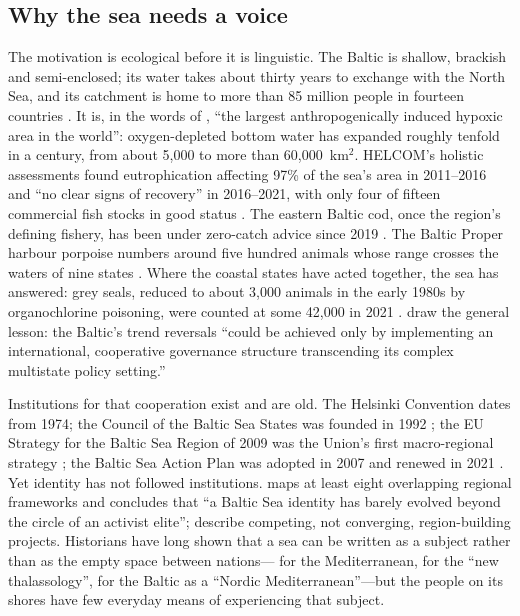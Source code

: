 \subsection{Why the sea needs a voice}
The motivation is ecological before it is linguistic. The Baltic is shallow, brackish and semi-enclosed; its water takes about thirty years to exchange with the North Sea, and its catchment is home to more than 85 million people in fourteen countries \citep{helcom2023}. It is, in the words of \citet{carstensen2014}, ``the largest anthropogenically induced hypoxic area in the world'': oxygen-depleted bottom water has expanded roughly tenfold in a century, from about 5,000 to more than 60,000~km$^2$. HELCOM's holistic assessments found eutrophication affecting 97\% of the sea's area in 2011--2016 and ``no clear signs of recovery'' in 2016--2021, with only four of fifteen commercial fish stocks in good status \citep{helcom2018,helcom2023}. The eastern Baltic cod, once the region's defining fishery, has been under zero-catch advice since 2019 \citep{ices2019}. The Baltic Proper harbour porpoise numbers around five hundred animals whose range crosses the waters of nine states \citep{amundin2022}. Where the coastal states have acted together, the sea has answered: grey seals, reduced to about 3,000 animals in the early 1980s by organochlorine poisoning, were counted at some 42,000 in 2021 \citep{helcomseal}. \citet{reusch2018} draw the general lesson: the Baltic's trend reversals ``could be achieved only by implementing an international, cooperative governance structure transcending its complex multistate policy setting.''

Institutions for that cooperation exist and are old. The Helsinki Convention dates from 1974; the Council of the Baltic Sea States was founded in 1992 \citep{cbss1992}; the EU Strategy for the Baltic Sea Region of 2009 was the Union's first macro-regional strategy \citep{eusbsr2009}; the Baltic Sea Action Plan was adopted in 2007 and renewed in 2021 \citep{helcombsap2021}. Yet identity has not followed institutions. \citet{gotz2016} maps at least eight overlapping regional frameworks and concludes that ``a Baltic Sea identity has barely evolved beyond the circle of an activist elite''; \citet{lehti2003} describe competing, not converging, region-building projects. Historians have long shown that a sea can be written as a subject rather than as the empty space between nations---\citet{braudel1949} for the Mediterranean, \citet{horden2000,horden2006} for the ``new thalassology'', \citet{north2015} for the Baltic as a ``Nordic Mediterranean''---but the people on its shores have few everyday means of experiencing that subject.

